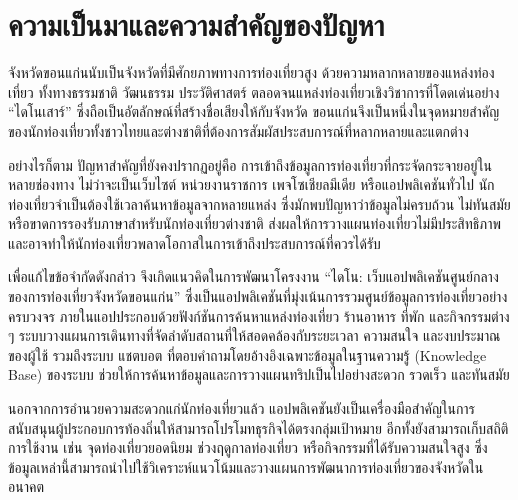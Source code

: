 
\section{ความเป็นมาและความสำคัญของปัญหา}

จังหวัดขอนแก่นนับเป็นจังหวัดที่มีศักยภาพทางการท่องเที่ยวสูง ด้วยความหลากหลายของแหล่งท่องเที่ยว ทั้งทางธรรมชาติ วัฒนธรรม ประวัติศาสตร์ ตลอดจนแหล่งท่องเที่ยวเชิงวิชาการที่โดดเด่นอย่าง ``ไดโนเสาร์'' ซึ่งถือเป็นอัตลักษณ์ที่สร้างชื่อเสียงให้กับจังหวัด ขอนแก่นจึงเป็นหนึ่งในจุดหมายสำคัญของนักท่องเที่ยวทั้งชาวไทยและต่างชาติที่ต้องการสัมผัสประสบการณ์ที่หลากหลายและแตกต่าง

อย่างไรก็ตาม ปัญหาสำคัญที่ยังคงปรากฏอยู่คือ การเข้าถึงข้อมูลการท่องเที่ยวที่กระจัดกระจายอยู่ในหลายช่องทาง ไม่ว่าจะเป็นเว็บไซต์ หน่วยงานราชการ เพจโซเชียลมีเดีย หรือแอปพลิเคชันทั่วไป นักท่องเที่ยวจำเป็นต้องใช้เวลาค้นหาข้อมูลจากหลายแหล่ง ซึ่งมักพบปัญหาว่าข้อมูลไม่ครบถ้วน ไม่ทันสมัย หรือขาดการรองรับภาษาสำหรับนักท่องเที่ยวต่างชาติ ส่งผลให้การวางแผนท่องเที่ยวไม่มีประสิทธิภาพและอาจทำให้นักท่องเที่ยวพลาดโอกาสในการเข้าถึงประสบการณ์ที่ควรได้รับ

เพื่อแก้ไขข้อจำกัดดังกล่าว จึงเกิดแนวคิดในการพัฒนาโครงงาน ``ไดโน: เว็บแอปพลิเคชันศูนย์กลางของการท่องเที่ยวจังหวัดขอนแก่น'' ซึ่งเป็นแอปพลิเคชันที่มุ่งเน้นการรวมศูนย์ข้อมูลการท่องเที่ยวอย่างครบวงจร ภายในแอปประกอบด้วยฟังก์ชันการค้นหาแหล่งท่องเที่ยว ร้านอาหาร ที่พัก และกิจกรรมต่าง ๆ ระบบวางแผนการเดินทางที่จัดลำดับสถานที่ให้สอดคล้องกับระยะเวลา ความสนใจ และงบประมาณของผู้ใช้ รวมถึงระบบ แชตบอต ที่ตอบคำถามโดยอ้างอิงเฉพาะข้อมูลในฐานความรู้ (Knowledge Base) ของระบบ ช่วยให้การค้นหาข้อมูลและการวางแผนทริปเป็นไปอย่างสะดวก รวดเร็ว และทันสมัย

นอกจากการอำนวยความสะดวกแก่นักท่องเที่ยวแล้ว แอปพลิเคชันยังเป็นเครื่องมือสำคัญในการสนับสนุนผู้ประกอบการท้องถิ่นให้สามารถโปรโมทธุรกิจได้ตรงกลุ่มเป้าหมาย อีกทั้งยังสามารถเก็บสถิติการใช้งาน เช่น จุดท่องเที่ยวยอดนิยม ช่วงฤดูกาลท่องเที่ยว หรือกิจกรรมที่ได้รับความสนใจสูง ซึ่งข้อมูลเหล่านี้สามารถนำไปใช้วิเคราะห์แนวโน้มและวางแผนการพัฒนาการท่องเที่ยวของจังหวัดในอนาคต

